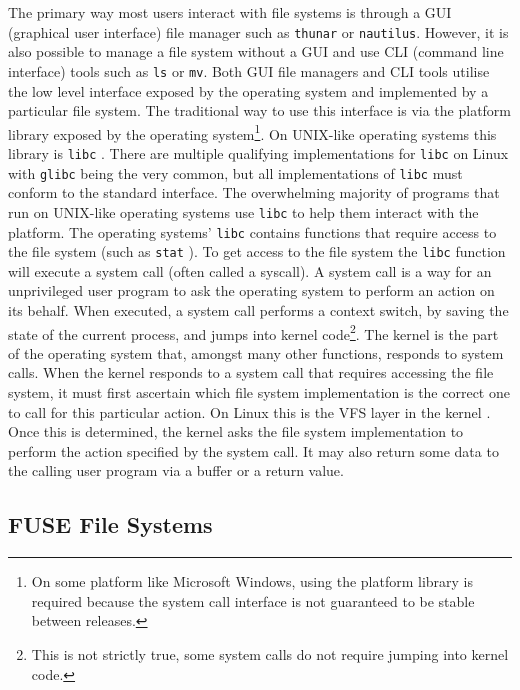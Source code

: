The primary way most users interact with file systems is through a GUI
(graphical user interface) file manager such as \texttt{thunar} or
\texttt{nautilus}. 
However, it is also possible to manage a file system without a GUI and use CLI
(command line interface) tools such as \texttt{ls} or \texttt{mv}. Both GUI
file managers and CLI tools utilise the low level interface exposed by the
operating system and implemented by a particular file system. The traditional
way to use this interface is via the platform library exposed by the operating
system\footnote{On some platform like Microsoft Windows, using the platform
library is required because the system call interface is not guaranteed to be
stable between releases.}. On UNIX-like operating systems this library is
\texttt{libc} \cite{libc}. There are multiple qualifying implementations for
\texttt{libc} on Linux with \texttt{glibc} being the very common, but all
implementations of \texttt{libc} must conform to the standard interface. The
overwhelming majority of programs that run on UNIX-like operating systems use
\texttt{libc} to help them interact with the platform. The operating systems'
\texttt{libc} contains functions that require access to the file system (such
as \texttt{stat} \cite{stat-syscall}). To get access to the file system the
\texttt{libc} function will execute a system call \cite{syscalls} (often called
a syscall). A system call is a way for an unprivileged user program to ask the
operating system to perform an action on its behalf. When executed, a system
call performs a context switch, by saving the state of the current process, and
jumps into kernel code\footnote{This is not strictly true, some system calls do
not require jumping into kernel code.}. The kernel is the part of the operating
system that, amongst many other functions, responds to system calls. When the
kernel responds to a system call that requires accessing the file system, it
must first ascertain which file system implementation is the correct one to
call for this particular action. On Linux this is the VFS layer in the kernel
\cite{kernel-vfs}. Once this is determined, the kernel asks the file system
implementation to perform the action specified by the system call. It may also
return some data to the calling user program via a buffer or a return value.

\subsection{FUSE File Systems}

